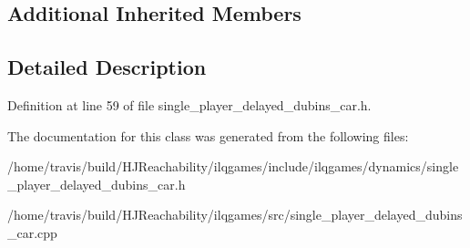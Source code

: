 \subsection*{Additional Inherited Members}


\subsection{Detailed Description}


Definition at line 59 of file single\+\_\+player\+\_\+delayed\+\_\+dubins\+\_\+car.\+h.



The documentation for this class was generated from the following files\+:\begin{DoxyCompactItemize}
\item 
/home/travis/build/\+H\+J\+Reachability/ilqgames/include/ilqgames/dynamics/single\+\_\+player\+\_\+delayed\+\_\+dubins\+\_\+car.\+h\item 
/home/travis/build/\+H\+J\+Reachability/ilqgames/src/single\+\_\+player\+\_\+delayed\+\_\+dubins\+\_\+car.\+cpp\end{DoxyCompactItemize}
